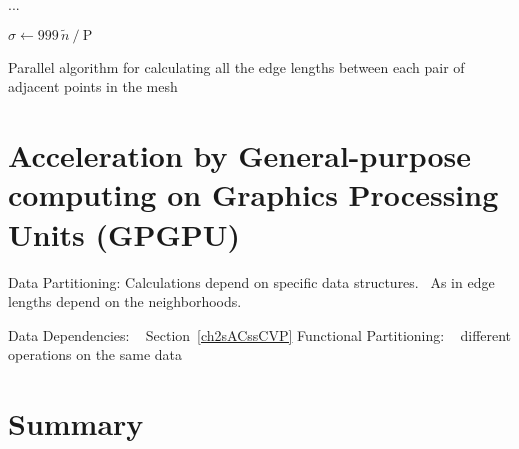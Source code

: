 ...


\begin{algorithm}[h]
	\DontPrintSemicolon


	\bigskip
\nl	{}\;
\nl	$\sigma \leftarrow 999\,\tilde{n}\mathbin{/}\text{P}$\;
\nl	{}
	\caption{Parallel algorithm for calculating all the edge lengths between each pair of adjacent points in the mesh\label{alg:serialCalculateEdgeLengths}}
\end{algorithm}
%

%
%
%
%
\section[Acceleration by GPGPU]{Acceleration by General-purpose
computing on Graphics Processing Units (GPGPU)}

%
Data Partitioning:
Calculations depend on specific data structures.~\cite[p.~357]{Lang17}
As in edge lengths depend on the neighborhoods.

%
Data Dependencies: ~\cite[p.~358]{Lang17}
Section~\ref{ch2sACssCVP}
%
Functional Partitioning: ~\cite[p.~359]{Lang17}
different operations on the same data

%
%
%
\section{Summary}

